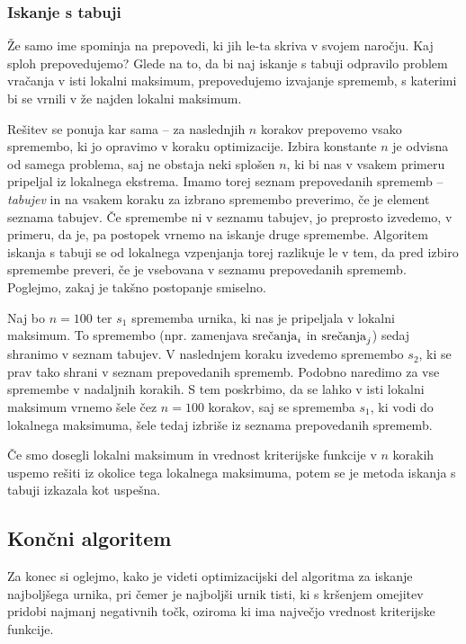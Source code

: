 \documentclass[10pt, a4paper]{article}
\begin{document}
\subsubsection{Iskanje s tabuji}

Že samo ime spominja na prepovedi, ki jih le-ta skriva v svojem naročju. Kaj sploh prepovedujemo?
Glede na to, da bi naj iskanje s tabuji odpravilo problem vračanja v isti lokalni maksimum,
prepovedujemo izvajanje sprememb, s katerimi bi se vrnili v že najden lokalni maksimum.

Rešitev se ponuja kar sama -- za naslednjih $n$ korakov prepovemo vsako spremembo, ki jo
opravimo v koraku optimizacije. Izbira konstante $n$ je odvisna od samega problema, saj
ne obstaja neki splošen $n$, ki bi nas v vsakem primeru pripeljal iz lokalnega ekstrema.
Imamo torej seznam prepovedanih sprememb -- \emph{tabujev} in na vsakem koraku za izbrano
spremembo preverimo, če je element seznama tabujev. Če spremembe ni v seznamu tabujev, jo
preprosto izvedemo, v primeru, da je, pa postopek vrnemo na iskanje druge spremembe.
Algoritem iskanja s tabuji se od lokalnega vzpenjanja torej razlikuje le v tem, da pred
izbiro spremembe preveri, če je vsebovana v seznamu prepovedanih sprememb. Poglejmo, zakaj
je takšno postopanje smiselno.

Naj bo $n = 100$ ter $s_1$ sprememba urnika, ki nas je pripeljala v lokalni maksimum. To
spremembo (npr. zamenjava $\textnormal{srečanja}_i$ in $\textnormal{srečanja}_j$) sedaj shranimo v
seznam tabujev. V naslednjem koraku izvedemo spremembo $s_2$, ki se prav tako shrani v
seznam prepovedanih sprememb. Podobno naredimo za vse spremembe v nadaljnih korakih. S
tem poskrbimo, da se lahko v isti lokalni maksimum vrnemo šele čez $n = 100$ korakov, saj
se sprememba $s_1$, ki vodi do lokalnega maksimuma, šele tedaj izbriše iz seznama
prepovedanih sprememb.

Če smo dosegli lokalni maksimum in vrednost kriterijske funkcije v $n$ korakih uspemo
rešiti iz okolice tega lokalnega maksimuma, potem se je metoda iskanja s tabuji izkazala
kot uspešna.

\subsection{Končni algoritem}

Za konec si oglejmo, kako je videti optimizacijski del algoritma za iskanje najboljšega
urnika, pri čemer je najboljši urnik tisti, ki s kršenjem omejitev pridobi najmanj negativnih
točk, oziroma ki ima največjo vrednost kriterijske funkcije.
\end{document}
